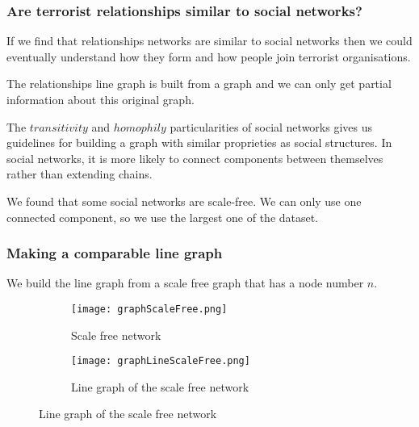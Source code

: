 \begin{frame}
\frametitle{Are terrorist relationships similar to social networks?}

If we find that relationships networks are similar to social networks then we could eventually understand how they form and how people join terrorist organisations.


The relationships line graph is built from a graph and we can only get partial information about this original graph.

The $transitivity$ and $homophily$ particularities of social networks gives us guidelines for building a graph with similar proprieties as social structures. 
In social networks, it is more likely to connect components between themselves rather than extending chains.

We found that some social networks are scale-free. 
We can only use one connected component, so we use the largest one of the dataset.

\end{frame}


\begin{frame}
\frametitle{Making a comparable line graph}
We build the line graph from a scale free graph that has a node number $n$.

\begin{figure}[H]
\begin{center}
    \begin{subfigure}[b]{0.4\textwidth}
        \texttt{[image: graphScaleFree.png]}
        \caption{Scale free network}
        \label{fig:Scalefree}
    \end{subfigure}
    \begin{subfigure}[b]{0.4\textwidth}
        \texttt{[image: graphLineScaleFree.png]}
        \caption{Line graph of the scale free network}
        \label{fig:lineG}
    \end{subfigure}
\label{fig:RelationshipScaleFree}
\end{center}
\end{figure}

\end{frame}


